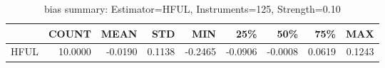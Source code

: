 \begin{table}[ht]
\centering
\caption{bias summary: Estimator=HFUL, Instruments=125, Strength=0.10}
\begin{tabular}{lrrrrrrrr}
\toprule
 & COUNT & MEAN & STD & MIN & 25\% & 50\% & 75\% & MAX \\
\midrule
HFUL & 10.0000 & -0.0190 & 0.1138 & -0.2465 & -0.0906 & -0.0008 & 0.0619 & 0.1243 \\
\bottomrule
\end{tabular}
\end{table}
